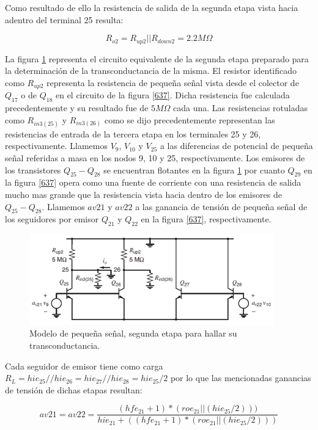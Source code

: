 \documentclass[12pt,a4paper,final,headinclude,footinclude,BCOR5mm]{scrartcl}
\begin{document}
Como resultado de ello la resistencia de salida de la segunda etapa vista hacia adentro del terminal 25 resulta:

$$R_{o2} = R_{up2}||R_{down2} = 2.2 M\Omega$$

La figura \ref{645} representa el circuito equivalente de la segunda etapa preparado para la determinación de la transconductancia de la misma. El resistor identificado como $R_{up2}$ representa la resistencia de pequeña señal vista desde el colector de $Q_{17}$ o de $Q_{18}$ en el circuito de la figura \ref{637}. Dicha resistencia fue calculada precedentemente y su resultado fue de $5 M\Omega$ cada una. Las resistencias rotuladas como $R_{in3(25)}$ y $R_{in3(26)}$ como se dijo precedentemente representan las resistencias de entrada de la tercera etapa en los terminales 25 y 26, respectivamente. Llamemos $V_{9}$, $V_{10}$ y $V_{25}$  a las diferencias de potencial de pequeña señal referidas a masa en los nodos 9, 10 y 25, respectivamente. Los emisores de los transistores $Q_{25} - Q_{28}$ se encuentran flotantes en la figura \ref{645} por cuanto $Q_{29}$ en la figura \ref{637} opera como una fuente de corriente con una resistencia de salida mucho mas grande que la resistencia vista hacia dentro de los emisores de $Q_{25} - Q_{28}$.  Llamemos $av21$ y $av22$ a las ganancia de tensión de pequeña señal de los seguidores por emisor $Q_{21}$ y $Q_{22}$ en la figura \ref{637}, respectivamente.

\begin{figure}[!h]
\begin{center}
\includegraphics[width=300pt]{./imagenes/ssofsecsta.png}
\end{center}
\caption{Modelo de pequeña señal, segunda etapa para hallar su transconductancia.}
\label{645}
\end{figure}

Cada seguidor de emisor tiene como carga $R_{L} = hie_{25}//hie_{26} = hie_{27}//hie_{28} = hie_{25}/2$ por lo que las mencionadas ganancias de tensión de dichas etapas resultan:

$$av21 = av22 = \frac{(hfe_{21} + 1) * (roe_{21}||(hie_{25}/2)))}{hie_{21} + ((hfe_{21} + 1) * (roe_{21}||(hie_{25}/2)))}$$
\end{document}
